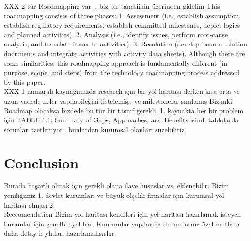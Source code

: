\documentclass[journal]{IEEEtran}
\begin{document}
XXX 2 tür Roadmapping var .. biz bir  tanesiinin  üzerinden gidelim
This roadmapping consists of three phases:
1. Assessment (i.e., establish assumption, establish regulatory requirements, establish
committed milestones, depict logics and planned activities).
2. Analysis (i.e., identify issues, perform root-cause analysis, and translate issues to
activities).
3. Resolution (develop issue-resolution documents and integrate activities with activity
data sheets).
Although there are some similarities, this roadmapping approach is fundamentally
different (in purpose, scope, and steps) from the technology roadmapping process
addressed by this paper.\cite{garcia1997fundamentals}
\\

XXX 1 numaralı kaynağımızda research için bir yol haritası derken kısa orta ve uzun vadede neler yapılabileğini listelemiş.. ve milestonelar sıralamış Bizimki Roadmap olacaksa bizdede bu tür bir tasnif gerekli.
1. kaynakta her bir problem için TABLE 1.1: Summary of Gaps, Approaches, and Benefits isimli tablolarda sorunlar özetleniyor.. bunlardan kurumsal olanları süzebiliriz.\cite{maughan2009roadmap}

\section{Conclusion}
Burada başarılı olmak için gerekli olana ilave hususlar vs.
eklenebilir.
 Bizim yeniliğimiz
1. devlet kurumları ve büyük ölçekli firmalar için kurumsal yol haritası olması
2.
\\
Reccomendation
Bizim yol haritası kendileri için yol haritası hazırlamak isteyen kurumlar için genelbir yol.har. Kuurumlar yapılarına durumlarına özel mutlaka daha detay lı yh.ları hazırlamalısırlar.





%
\end{document}
